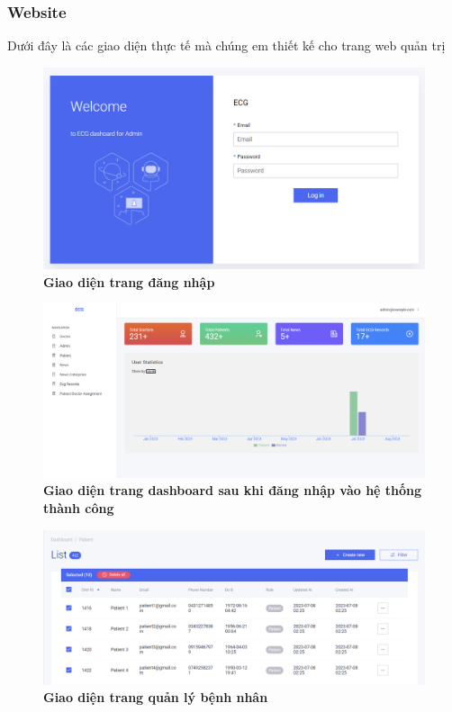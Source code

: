 \subsubsection{Website}

Dưới đây là các giao diện thực tế mà chúng em thiết kế cho trang web quản trị


\begin{figure}[H]
  \centering
  \includegraphics[scale=0.7]{Images/server/webUI/login.PNG}
  \caption[Giao diện trang đăng nhập]{\bfseries \fontsize{12pt}{0pt}\selectfont Giao diện trang đăng nhập}
  \label{login} %
\end{figure}


\begin{figure}[H]
  \centering
  \includegraphics[scale=0.4]{Images/server/webUI/dashboard.PNG}
  \caption[Giao diện trang]{\bfseries \fontsize{12pt}{0pt}\selectfont Giao diện trang dashboard sau khi đăng nhập vào hệ thống thành công}
  \label{dashboard} %
\end{figure}


\begin{figure}[H]
  \centering
  \includegraphics[scale=0.5]{Images/server/webUI/patient_list.PNG}
  \caption[Giao diện trang quản lý bệnh nhân]{\bfseries \fontsize{12pt}{0pt}\selectfont Giao diện trang quản lý bệnh nhân}
  \label{patient_list} %
\end{figure}


